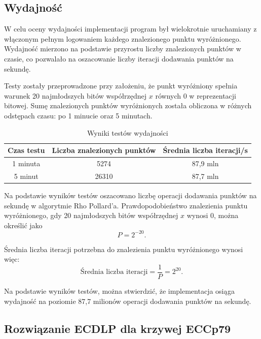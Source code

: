 \subsection{Wydajność}

W celu oceny wydajności implementacji program był wielokrotnie uruchamiany z
włączonym pełnym logowaniem każdego znalezionego punktu wyróżnionego. Wydajność
mierzono na podstawie przyrostu liczby znalezionych punktów w czasie, co pozwalało
na oszacowanie liczby iteracji dodawania punktów na sekundę.

Testy zostały przeprowadzone przy założeniu, że punkt wyróżniony spełnia warunek 20
najmłodszych bitów współrzędnej $x$ równych $0$ w reprezentacji bitowej.
Sumę znalezionych punktów wyróżnionych została obliczona w różnych odstępach czasu:
po 1 minucie oraz 5 minutach.

\begin{table}[h!]
    \centering
    \caption{Wyniki testów wydajności}
    \begin{tabular}{|c|c|c|}
        \hline
        \textbf{Czas testu} & \textbf{Liczba znalezionych punktów} &
        \textbf{Średnia liczba iteracji/s}                                    \\ \hline
        1 minuta            & 5274                                 & 87,9 mln \\ \hline
        5 minut             & 26310                                & 87,7 mln \\ \hline
    \end{tabular}
    \label{tab:performance}
\end{table}

Na podstawie wyników testów oszacowano liczbę operacji dodawania punktów na
sekundę w algorytmie Rho Pollard'a. Prawdopodobieństwo znalezienia punktu wyróżnionego,
gdy 20 najmłodszych bitów współrzędnej $x$ wynosi $0$, można określić jako
$$
    P = 2^{-20}.
$$

Średnia liczba iteracji potrzebna do znalezienia punktu wyróżnionego wynosi
więc:
$$
    \text{Średnia liczba iteracji} = \frac{1}{P} = 2^{20}.
$$

Na podstawie wyników testów, można stwierdzić, że implementacja osiąga wydajność na
poziomie 87,7 milionów operacji dodawania punktów na sekundę.

\subsection{Rozwiązanie ECDLP dla krzywej ECCp79}

